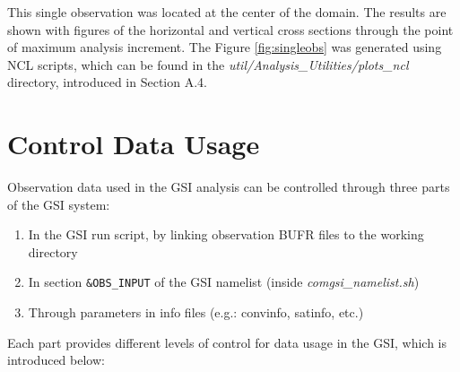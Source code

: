 This single observation was located at the center of the domain. The results are shown with figures of the horizontal and vertical cross sections through the point of maximum analysis increment. The Figure \ref{fig:singleobs} was generated using NCL scripts, which can be found in the \textit{util/Analysis\_Utilities/plots\_ncl} directory, introduced in Section A.4.

\section{Control Data Usage}
\label{sec4.3}

Observation data used in the GSI analysis can be controlled through three parts of the GSI system:

\begin{enumerate}
\item In the GSI run script, by linking observation BUFR files to the working directory 
\item In section \verb|&OBS_INPUT| of the GSI namelist (inside \textit{comgsi\_namelist.sh})
\item Through parameters in info files (e.g.: convinfo, satinfo, etc.)
\end{enumerate}

Each part provides different levels of control for data usage in the GSI, which is introduced below:

